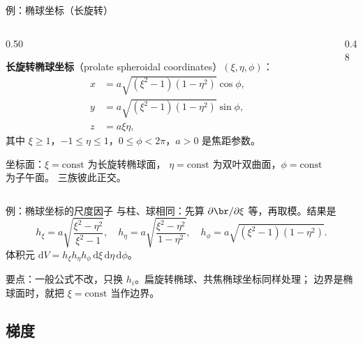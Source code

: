 \documentclass[fontset=windows, chinese, 10pt, xcolor=dvipsnames]{beamer}
\begin{document}
\begin{frame}{例：椭球坐标（长旋转）}
  \begin{columns}[c]
    \begin{column}{0.50\textwidth}
      {\small
      \textbf{长旋转椭球坐标}（prolate spheroidal coordinates）$(\xi,\eta,\phi)$：
      \begin{align*}
        x&=a\sqrt{(\xi^2-1)(1-\eta^2)}\cos\phi,\\
        y&=a\sqrt{(\xi^2-1)(1-\eta^2)}\sin\phi,\\
        z&=a\xi\eta,
      \end{align*}
      其中 $\xi\geq 1$，$-1\leq\eta\leq 1$，$0\leq\phi<2\pi$，$a>0$ 是焦距参数。

      坐标面：$\xi=\mathrm{const}$ 为长旋转椭球面，
      $\eta=\mathrm{const}$ 为双叶双曲面，$\phi=\mathrm{const}$ 为子午面。
      三族彼此正交。}
    \end{column}
    \begin{column}{0.48\textwidth}
      \centering
      \resizebox{\linewidth}{!}{}
    \end{column}
  \end{columns}
\end{frame}

\begin{frame}{例：椭球坐标的尺度因子}
  与柱、球相同：先算 $\partial\br/\partial\xi$ 等，再取模。结果是
  \begin{equation*}
    \boxed{\displaystyle
      h_{\xi}=a\sqrt{\frac{\xi^2-\eta^2}{\xi^2-1}},
      \quad
      h_{\eta}=a\sqrt{\frac{\xi^2-\eta^2}{1-\eta^2}},
      \quad
      h_{\phi}=a\sqrt{(\xi^2-1)(1-\eta^2)}.
    }
  \end{equation*}
  体积元 $\mathrm{d}V=h_{\xi}h_{\eta}h_{\phi}\,\mathrm{d}\xi\,\mathrm{d}\eta\,\mathrm{d}\phi$。
  \vspace{0.3em}

  要点：一般公式不改，只换 $h_i$。扁旋转椭球、共焦椭球坐标同样处理；
  边界是椭球面时，就把 $\xi=\mathrm{const}$ 当作边界。
\end{frame}

\subsection{梯度}
\end{document}
